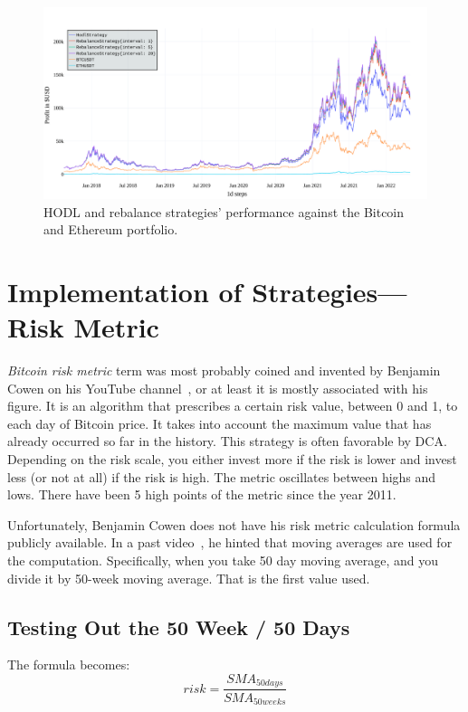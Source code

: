 \begin{figure}[!hbt]
    \centering
    \includegraphics[width=\columnwidth]{figures/benchmark.pdf}
    \caption{HODL and rebalance strategies' performance against the Bitcoin and Ethereum portfolio.}
    \label{figure-benchmark}
\end{figure}


\section{Implementation of Strategies---Risk Metric}
\label{section-strategies}
\emph{Bitcoin risk metric} term was most probably coined and invented by Benjamin Cowen on his YouTube channel~\cite{youtube:cowen-yt-channel}, or at least it is mostly associated with his figure. It is an algorithm that prescribes a certain risk value, between 0 and 1, to each day of Bitcoin price. It takes into account the maximum value that has already occurred so far in the history. This strategy is often favorable by DCA. Depending on the risk scale, you either invest more if the risk is lower and invest less (or not at all) if the risk is high. The metric oscillates between highs and lows. There have been 5 high points of the metric since the year 2011.

Unfortunately, Benjamin Cowen does not have his risk metric calculation formula publicly available. In a past video~\cite{youtube:cowen-moving-average}, he hinted that moving averages are used for the computation. Specifically, when you take 50 day moving average, and you divide it by 50-week moving average. That is the first value used.

\subsection*{Testing Out the 50 Week / 50 Days}
\label{subsection-50week50days}
The formula becomes:
$$risk = \frac{\mathit{SMA}_{50 days}}{\mathit{SMA}_{50 weeks}}$$

